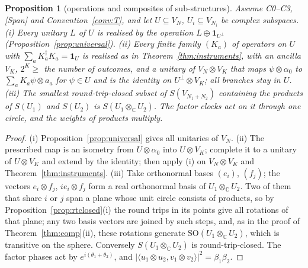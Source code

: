 \documentclass[aps,pra,onecolumn,superscriptaddress,nofootinbib,10pt]{revtex4-2}
\newtheorem{proposition}[theorem]{Proposition}
\theoremstyle{definition}
\theoremstyle{remark}
\newcommand{\C}{\mathbb{C}}
\newcommand{\ip}[2]{\langle #1,#2\rangle}
\newcommand{\SO}{\mathrm{SO}}
\begin{document}
\begin{proposition}[operations and composites of sub-structures]\label{prop:subops}
Assume C0--C3, [Span] and Convention~\ref{conv:T}, and let $U\subseteq V_N$, $U_i\subseteq V_{N_i}$ be complex subspaces.
(i) Every unitary $L$ of $U$ is realised by the operation $L\oplus\mathbf1_{U^\perp}$ (Proposition~\ref{prop:universal}).
(ii) Every finite family $(K_a)$ of operators on $U$ with $\sum_aK_a^\dagger K_a=\mathbf1_U$ is realised as in
Theorem~\ref{thm:instruments}, with an ancilla $V_K$, $2^K\ge$ the number of outcomes, and a unitary of $V_N\otimes V_K$ that
maps $\psi\otimes\alpha_0$ to $\sum_aK_a\psi\otimes a_a$ for $\psi\in U$ and is the identity on $U^\perp\otimes V_K$; all branches stay in $U$.
(iii) The smallest round-trip-closed subset of $S(V_{N_1+N_2})$ containing the products of $S(U_1)$ and $S(U_2)$ is
$S(U_1\otimes_\C U_2)$.  The factor clocks act on it through one circle, and the weights of products multiply.
\end{proposition}
\begin{proof}
(i) Proposition~\ref{prop:universal} gives all unitaries of $V_N$.  (ii) The prescribed map is an isometry from
$U\otimes\alpha_0$ into $U\otimes V_K$; complete it to a unitary of $U\otimes V_K$ and extend by the identity; then apply (i)
on $V_N\otimes V_K$ and Theorem~\ref{thm:instruments}.  (iii) Take orthonormal bases $(e_i)$, $(f_j)$; the vectors $e_i\otimes f_j$,
$ie_i\otimes f_j$ form a real orthonormal basis of $U_1\otimes_\C U_2$.  Two of them that share $i$ or $j$ span a plane whose
unit circle consists of products, so by Proposition~\ref{prop:rtclosed}(i) the round trips in its points give all
rotations of that plane; any two basis vectors are joined by such steps, and, as in the proof of
Theorem~\ref{thm:comp}(ii), these rotations generate $\SO(U_1\otimes_\C U_2)$, which is transitive on the sphere.
Conversely $S(U_1\otimes_\C U_2)$ is round-trip-closed.  The factor phases act by $e^{i(\theta_1+\theta_2)}$, and
$\lvert\ip{u_1\otimes u_2}{v_1\otimes v_2}\rvert^2=\beta_1\beta_2$.
\end{proof}
\end{document}
